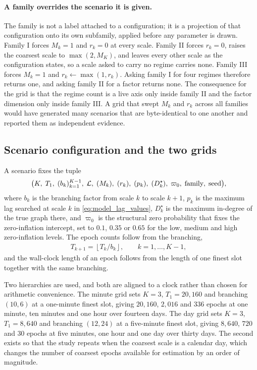 \paragraph{A family overrides the scenario it is given.}
The family is not a label attached to a configuration; it is a projection of
that configuration onto its own subfamily, applied before any parameter is
drawn. Family I forces \(M_k = 1\) and \(r_k = 0\) at every scale. Family II
forces \(r_k = 0\), raises the coarsest scale to \(\max(2, M_K)\), and leaves
every other scale as the configuration states, so a scale asked to carry no
regime carries none. Family III forces
\(M_k = 1\) and \(r_k \gets \max(1, r_k)\). Asking family I for four regimes
therefore returns one, and asking family II for a factor returns none. The
consequence for the grid is that the regime count is a live axis only inside
family II and the factor dimension only inside family III. A grid that swept
\(M_k\) and \(r_k\) across all families would have generated many scenarios
that are byte-identical to one another and reported them as independent
evidence.

\subsection{Scenario configuration and the two grids}
\label{sec:benchmark_grid}

A scenario fixes the tuple
\begin{align}
\bigl(
K,\;
T_1,\;
(b_k)_{k=1}^{K-1},\;
{\mathcal{L}},\;
(M_k),\;
(r_k),\;
(p_k),\;
(D_k^\star),\;
\varpi_0,\;
\text{family},\;
\text{seed}
\bigr),
\label{eq:bench_scenario}
\end{align}
where \(b_k\) is the branching factor from scale \(k\) to scale \(k+1\),
\(p_k\) is the maximum lag searched at scale \(k\) in
\cref{eq:model_lag_values}, \(D_k^\star\) is the maximum
in-degree of the true graph there, and \(\varpi_0\) is the structural zero
probability that fixes the zero-inflation intercept, set to \(0.1\), \(0.35\)
or \(0.65\) for the low, medium and high zero-inflation levels. The epoch
counts follow from the branching,
\begin{align}
T_{k+1} = \left\lfloor T_k / b_k \right\rfloor,
\qquad k = 1,\dots,K-1,
\label{eq:bench_epochs}
\end{align}
and the wall-clock length of an epoch follows from the length of one finest
slot together with the same branching.

Two hierarchies are used, and both are aligned to a clock rather than chosen
for arithmetic convenience. The minute grid sets \(K = 3\), \(T_1 = 20{,}160\)
and branching \((10, 6)\) at a one-minute finest slot, giving \(20{,}160\),
\(2{,}016\) and \(336\) epochs at one minute, ten minutes and one hour over
fourteen days. The day grid sets \(K = 3\), \(T_1 = 8{,}640\) and branching
\((12, 24)\) at a five-minute finest slot, giving \(8{,}640\), \(720\) and
\(30\) epochs at five minutes, one hour and one day over thirty days. The
second exists so that the study repeats when the coarsest scale is a calendar
day, which changes the number of coarsest epochs available for estimation by
an order of magnitude.

